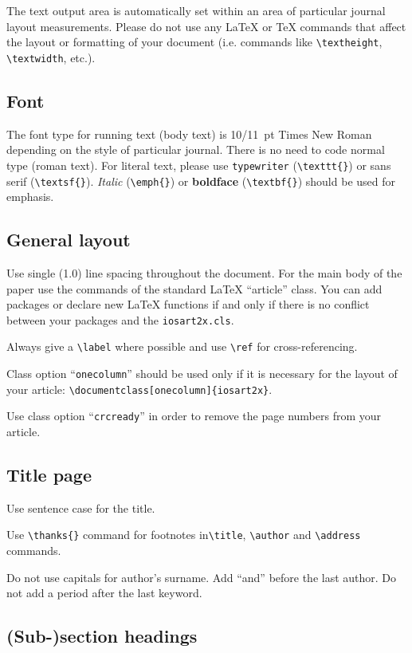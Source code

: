 \documentclass[ais]{iosart2x}
\begin{document}
The text output area is automatically set within an area of particular journal layout measurements.
Please do not use any
\LaTeX{} or \TeX{} commands that affect the layout or formatting of
your document (i.e. commands like \verb|\textheight|,
\verb|\textwidth|, etc.).

\subsection{Font}

The font type for running text (body text) is 10/11~pt Times New Roman
depending on the style of particular journal.
There is no need to code normal type (roman text). For literal text, please use
\texttt{type\-writer} (\verb|\texttt{}|)
or \textsf{sans serif} (\verb|\textsf{}|). \emph{Italic} (\verb|\emph{}|)
or \textbf{boldface} (\verb|\textbf{}|) should be used for emphasis.


\subsection{General layout}

Use single (1.0) line spacing throughout the document. For the main
body of the paper use the commands of the standard \LaTeX{}
``article'' class. You can add packages or declare new \LaTeX{}
functions if and only if there is no conflict between your packages
and the \texttt{iosart2x.cls}.

Always give a \verb|\label| where possible and use \verb|\ref| for cross-referencing.

Class option ``\texttt{onecolumn}'' should be used only if it is
necessary for the layout of your article:\hfill\break
\verb|\documentclass[onecolumn]{iosart2x}|.

Use class option ``\texttt{crcready}'' in order to remove the page numbers from your article.


\subsection{Title page}

Use sentence case for the title.

Use \verb|\thanks{}| command for footnotes in\break \verb|\title|,
\verb|\author| and \verb|\address| commands.

Do not use capitals for author's surname. Add ``and'' before the last
author. Do not add a period after the last keyword.


\subsection{(Sub-)section headings}
\end{document}
